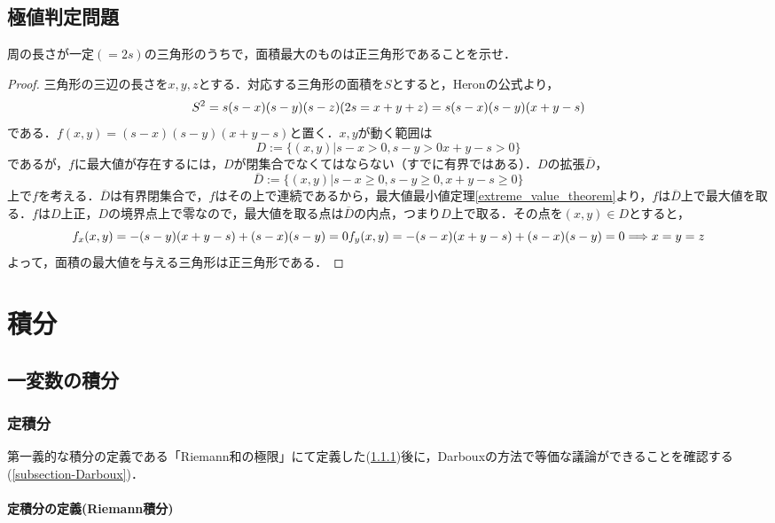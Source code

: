 \documentclass[uplatex, dvipdfmx]{jsreport}
\begin{document}
\chapter{極値判定問題}

\begin{shadebox}\begin{question}周の長さが一定$(=2s)$の三角形のうちで，面積最大のものは正三角形であることを示せ．\end{question}\end{shadebox}
\begin{proof}三角形の三辺の長さを$x,y,z$とする．対応する三角形の面積を$S$とすると，Heronの公式より，$$S^2=s(s-x)(s-y)(s-z) (2s=x+y+z) \\ =s(s-x)(s-y)(x+y-s)$$である．$f(x,y)=(s-x)(s-y)(x+y-s)$と置く．$x,y$が動く範囲は$$D:=\{ (x,y)|s-x>0, s-y>0 x+y-s>0 \}$$であるが，$f$に最大値が存在するには，$D$が閉集合でなくてはならない（すでに有界ではある）．$D$の拡張$\overline{D}$，$$\overline{D} := \{ (x,y)|s-x \ge 0, s-y \ge 0, x+y-s \ge 0 \}$$上で$f$を考える．$\overline{D}$は有界閉集合で，$f$はその上で連続であるから，最大値最小値定理\ref{extreme_value_theorem}より，$f$は$\overline{D}$上で最大値を取る．$f$は$D$上正，$D$の境界点上で零なので，最大値を取る点は$\overline{D}$の内点，つまり$D$上で取る．その点を$(x,y)\in D$とすると，$$f_x(x,y)=-(s-y)(x+y-s)+(s-x)(s-y)=0\\f_y(x,y)=-(s-x)(x+y-s)+(s-x)(s-y)=0\\ \Longrightarrow x=y=z$$よって，面積の最大値を与える三角形は正三角形である．
\end{proof}

\part{積分}
\chapter{一変数の積分}
\section{定積分}

第一義的な積分の定義である「Riemann和の極限」にて定義した(\ref{subsection-Riemann})後に，Darbouxの方法で等価な議論ができることを確認する(\ref{subsection-Darboux})．


\subsection{定積分の定義(Riemann積分)}\label{subsection-Riemann}
\end{document}
